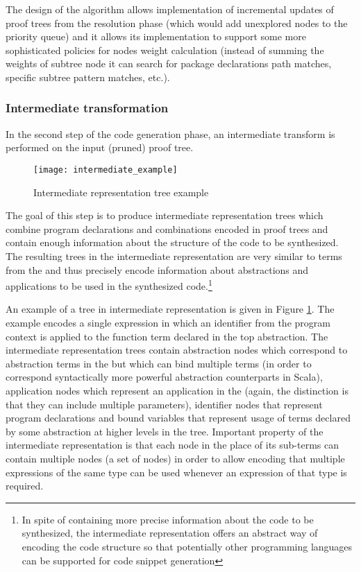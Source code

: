 The design of the algorithm allows implementation of incremental updates of proof trees from the resolution phase (which would add unexplored nodes to the priority queue) and it allows its implementation to support some more sophisticated policies for nodes weight calculation (instead of summing the weights of subtree node it can search for package declarations path matches, specific subtree pattern matches, etc.). 

\subsubsection{Intermediate transformation}

In the second step of the code generation phase, an intermediate transform is performed on the input (pruned) proof tree.

\begin{figure}[ht]
\centering
\texttt{[image: intermediate\_example]}
\caption{Intermediate representation tree example}
\label{fig:intermediate_example}
\end{figure}

The goal of this step is to produce intermediate representation trees which combine program declarations and combinations encoded in proof trees and contain enough information about the structure of the code to be synthesized.
The resulting trees in the intermediate representation are very similar to terms from the \LC and thus precisely encode information about abstractions and applications to be used in the synthesized code.\footnote{In spite of containing more precise information about the code to be synthesized, the intermediate representation offers an abstract way of encoding the code structure so that potentially other programming languages can be supported for code snippet generation}

An example of a tree in intermediate representation is given in Figure \ref{fig:intermediate_example}.
The example encodes a single expression in which an identifier from the program context is applied to the function term declared in the top abstraction.
The intermediate representation trees contain abstraction nodes which correspond to abstraction terms in the \LC but which can bind multiple terms (in order to correspond syntactically more powerful abstraction counterparts in Scala), application nodes which represent an application in the \LC (again, the distinction is that they can include multiple parameters), identifier nodes that represent program declarations and bound variables that represent usage of terms declared by some abstraction at higher levels in the tree.
Important property of the intermediate representation is that each node in the place of its sub-terms can contain multiple nodes (a set of nodes) in order to allow encoding that multiple expressions of the same type can be used whenever an expression of that type is required.

